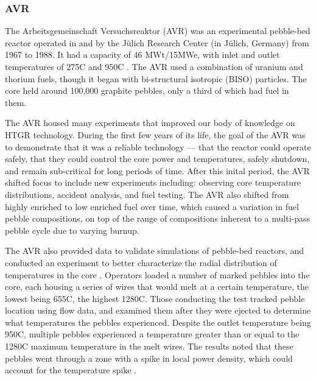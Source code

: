 \subsubsection{AVR}
\label{avr}

The Arbeitsgemeinschaft Versuchsreaktor (AVR) was an experimental pebble-bed reactor operated in and by the Jülich Research Center (in Jülich, Germany) from 1967 to 1988.  It had a capacity of 46 MWt/15MWe, with inlet and outlet temperatures of 275\textdegree  C and 950\textdegree  C \cite{beck_high_nodate}.  The AVR used a combination of uranium and thorium fuels, though it began with bi-structural isotropic (BISO) particles.  The core held around 100,000 graphite pebbles, only a third of which had fuel in them.

The AVR housed many experiments that improved our body of knowledge on HTGR technology.  During the first few years of its life, the goal of the AVR was to demonstrate that it was a reliable technology --- that the reactor could operate safely, that they could control the core power and temperatures, safely shutdown, and remain sub-critical for long periods of time.  After this inital period, the AVR shifted focus to include new experiments including: observing core temperature distributions, accident analysis, and fuel testing.  The AVR also shifted from highly enriched to low enriched fuel over time, which caused a variation in fuel pebble compositions, on top of the range of compositions inherent to a multi-pass pebble cycle due to varying burnup.

The AVR also provided data to validate simulations of pebble-bed reactors, and conducted an experiment to better characterize the radial distribution of temperatures in the core \cite{noauthor_results_1990}.  Operators loaded a number of marked pebbles into the core, each housing a series of wires that would melt at a certain temperature, the lowest being 655\textdegree  C, the highest 1280\textdegree  C.  Those conducting the test tracked pebble location using flow data, and examined them after they were ejected to determine what temperatures the pebbles experienced.  Despite the outlet temperature being 950\textdegree  C, multiple pebbles experienced a temperature greater than or equal to the 1280\textdegree C maximum temperature in the melt wires.  The results noted that these pebbles went through a zone with a spike in local power density, which could account for the temperature spike \cite{noauthor_results_1990}.

